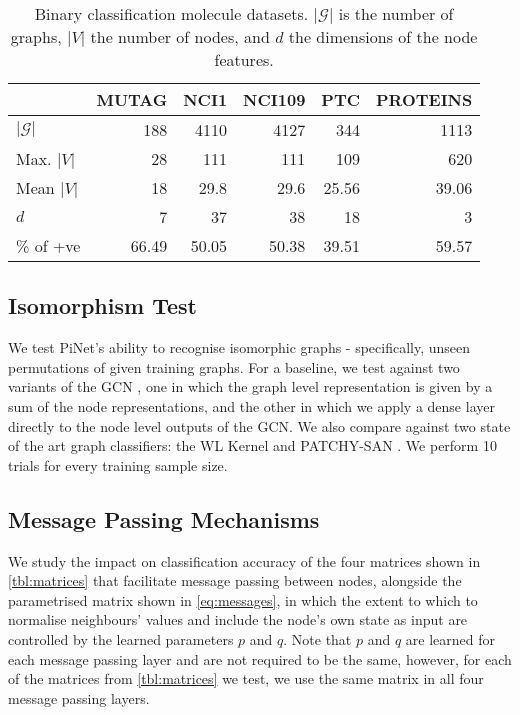 \documentclass{article}
\theoremstyle{definition}
\begin{document}
\begin{table}[b]
  \small
  \centering
  \begin{tabularx}{\linewidth}{lrrrrr}
  \toprule
 & MUTAG & NCI1 & NCI109 & PTC & PROTEINS \\ \midrule
 $|\mathcal{G}|$ & 188 & 4110 & 4127 & 344 & 1113 \\
 Max. $|V|$ & 28 & 111 & 111 & 109 & 620 \\
 Mean $|V|$ & 18 & 29.8 & 29.6 & 25.56 & 39.06 \\
 $d$ & 7 & 37 & 38 & 18 & 3 \\
 \% of +ve & 66.49 & 50.05 & 50.38 & 39.51 & 59.57 \\
\bottomrule
\end{tabularx}
\caption{Binary classification molecule datasets. $|\mathcal{G}|$ is the number of graphs, $|V|$ the number of nodes, and $d$ the dimensions of the node features.}
\label{tbl:graphstats}
\end{table}

\subsection{Isomorphism Test}
\label{sse:isomorphismexp}

We test PiNet's ability to recognise isomorphic graphs - specifically, unseen permutations of given training graphs. For a baseline, we test against two variants of the GCN \cite{Kipf2016}, one in which the graph level representation is given by a sum of the node representations, and the other in which we apply a dense layer directly to the node level outputs of the GCN. We also compare against two state of the art graph classifiers: the WL Kernel \cite{ShervashidzeNINOSHERVASHIDZE2011} and PATCHY-SAN \cite{Niepert2016}. We perform 10 trials for every training sample size.

\subsection{Message Passing Mechanisms}
\label{exp:message}

We study the impact on classification accuracy of the four matrices shown in \autoref{tbl:matrices} that facilitate message passing between nodes, alongside the parametrised matrix shown in \autoref{eq:messages}, in which the extent to which to normalise neighbours' values and include the node's own state as input are controlled by the learned parameters $p$ and $q$. Note that $p$ and $q$ are learned for each message passing layer and are not required to be the same, however, for each of the matrices from \autoref{tbl:matrices} we test, we use the same matrix in all four message passing layers.
\end{document}
